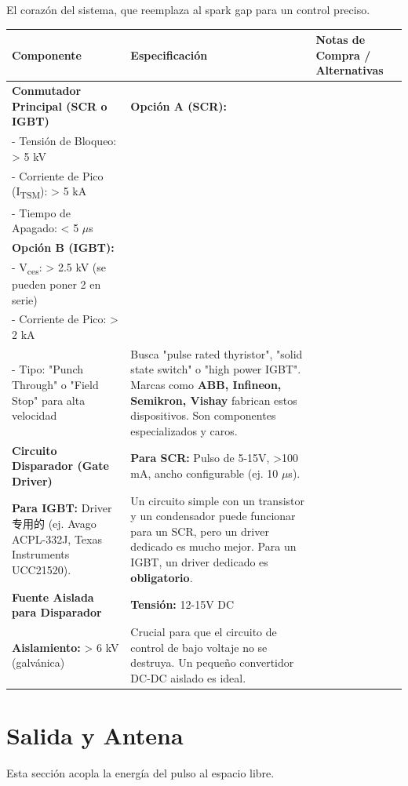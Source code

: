 \documentclass[11pt, a4paper]{article}
\begin{document}
El corazón del sistema, que reemplaza al spark gap para un control preciso.

\begin{longtable}{|p{3.5cm}|p{4.5cm}|p{6cm}|}
\hline
\rowcolor[gray]{0.9}
\textbf{Componente} & \textbf{Especificación} & \textbf{Notas de Compra / Alternativas} \\
\hline
\endhead

\textbf{Conmutador Principal (SCR o IGBT)} & 
\textbf{Opción A (SCR):} \\
- Tensión de Bloqueo: > 5 kV \\
- Corriente de Pico (I\textsubscript{TSM}): > 5 kA \\
- Tiempo de Apagado: < 5 $\mu$s \\
\textbf{Opción B (IGBT):} \\
- V\textsubscript{ces}: > 2.5 kV (se pueden poner 2 en serie) \\
- Corriente de Pico: > 2 kA \\
- Tipo: "Punch Through" o "Field Stop" para alta velocidad & 
Busca "pulse rated thyristor", "solid state switch" o "high power IGBT". Marcas como \textbf{ABB, Infineon, Semikron, Vishay} fabrican estos dispositivos. Son componentes especializados y caros. \\
\hline

\textbf{Circuito Disparador (Gate Driver)} & 
\textbf{Para SCR:} Pulso de 5-15V, >100 mA, ancho configurable (ej. 10 $\mu$s). \\
\textbf{Para IGBT:} Driver专用的 (ej. Avago ACPL-332J, Texas Instruments UCC21520). & 
Un circuito simple con un transistor y un condensador puede funcionar para un SCR, pero un driver dedicado es mucho mejor. Para un IGBT, un driver dedicado es \textbf{obligatorio}. \\
\hline

\textbf{Fuente Aislada para Disparador} & 
\textbf{Tensión:} 12-15V DC \\
\textbf{Aislamiento:} > 6 kV (galvánica) & 
Crucial para que el circuito de control de bajo voltaje no se destruya. Un pequeño convertidor DC-DC aislado es ideal. \\
\hline

\end{longtable}

\newpage
\section{Salida y Antena}

Esta sección acopla la energía del pulso al espacio libre.
\end{document}
